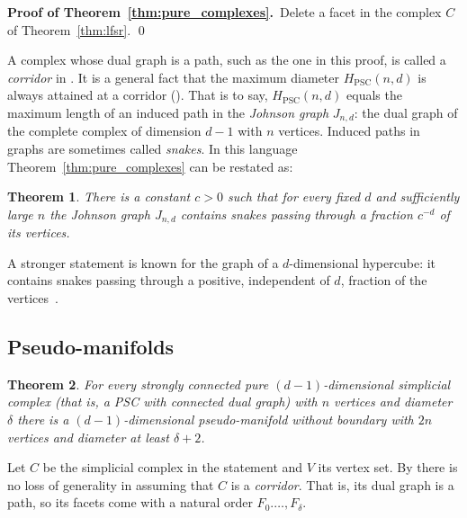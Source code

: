 \documentclass[12pt,a4paper]{article}
\newcommand{\PSC}{{\textrm{PSC}}}
\theoremstyle{plain}
\newtheorem{theorem}{Theorem}
\theoremstyle{definition}
\begin{document}
\medskip
\noindent
\textbf{Proof of Theorem~\ref{thm:pure_complexes}.}\ 
Delete a  facet in the complex $C$ of Theorem~\ref{thm:lfsr}.
\qed
\medskip

A complex whose dual graph is a path, such as the one in this proof, is called
a \emph{corridor} in \cite{Santos:progress}. It is a general fact that the maximum diameter $H_\PSC(n,d)$ is always attained at a corridor (\cite[Corollary 2.7]{Santos:progress}). That is to say, $H_\PSC(n,d)$ equals the maximum length of an induced path in the \emph{Johnson graph} $J_{n,d}$: the dual graph of the complete complex of dimension $d-1$ with $n$ vertices. Induced paths in graphs are sometimes called \emph{snakes}.  In this language Theorem~\ref{thm:pure_complexes} can be restated as:

\begin{theorem}
There is a constant $c>0$ such that for every fixed $d$ and sufficiently large $n$ the Johnson graph $J_{n,d}$ contains snakes passing through a fraction $c^{-d}$ of its vertices.
\end{theorem}

A stronger statement is known for the graph of a $d$-dimensional hypercube: it contains snakes passing through a positive, independent of $d$, fraction of the vertices~\cite{AbbottKatchalski}.


\subsection{Pseudo-manifolds}

\begin{theorem}
\label{thm:pseudo_manifolds}
For every strongly connected pure $(d-1)$-dimensional simplicial complex (that is, a PSC with connected dual graph) with $n$ vertices and diameter $\delta$ there is a $(d-1)$-dimensional pseudo-manifold without boundary with $2n$ vertices and diameter at least $\delta+2$.
\end{theorem}

Let $C$ be the simplicial complex in the statement and $V$ its vertex set. By \cite[Corollary 2.7]{Santos:progress} there is no loss of generality in assuming that $C$ is a \emph{corridor}. That is, its dual graph is a path, so its facets come with a natural order $F_0.\dots, F_\delta$. 
\end{document}
